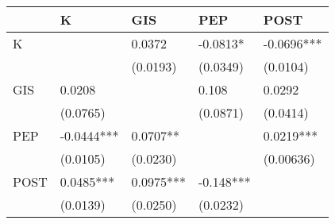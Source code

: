 \begin{tabular}{lllll}
\toprule
{} &           K &        GIS &        PEP &        POST \\
\midrule
K    &             &     0.0372 &   -0.0813* &  -0.0696*** \\
     &             &   (0.0193) &   (0.0349) &    (0.0104) \\
GIS  &      0.0208 &            &      0.108 &      0.0292 \\
     &    (0.0765) &            &   (0.0871) &    (0.0414) \\
PEP  &  -0.0444*** &   0.0707** &            &   0.0219*** \\
     &    (0.0105) &   (0.0230) &            &   (0.00636) \\
POST &   0.0485*** &  0.0975*** &  -0.148*** &             \\
     &    (0.0139) &   (0.0250) &   (0.0232) &             \\
\bottomrule
\end{tabular}
